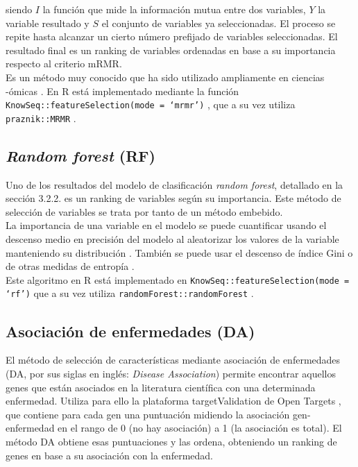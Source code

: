 siendo $I$ la función que mide la información mutua entre dos variables, $Y$ la variable resultado y $S$ el conjunto de variables ya seleccionadas. El proceso se repite hasta alcanzar un cierto número prefijado de variables seleccionadas. El resultado final es un ranking de variables ordenadas en base a su importancia respecto al criterio mRMR.\\

Es un método muy conocido que ha sido utilizado ampliamente en ciencias -ómicas \cite{Ding2005, Yang2013, Galvez2018, Castillo2019, Galvez2020}. En R está implementado mediante la función \texttt{KnowSeq::\linebreak featureSelection(mode = `mrmr')} \cite{KnowSeq}, que a su vez utiliza \texttt{praznik::MRMR} \cite{Kursa2020}.

\subsection{\textit{Random forest} (RF)}

Uno de los resultados del modelo de clasificación \textit{random forest}, detallado en la sección 3.2.2. es un ranking de variables según su importancia. Este método de selección de variables se trata por tanto de un método embebido.\\

La importancia de una variable en el modelo se puede cuantificar usando el descenso medio en precisión del modelo al aleatorizar los valores de la variable manteniendo su distribución \cite{Breiman2001, Breiman2002}. También se puede usar el descenso de índice Gini o de otras medidas de entropía \cite{Louppe2013}.\\

Este algoritmo en R está implementado en \texttt{KnowSeq::featureSelection(mode = `rf')} \cite{KnowSeq} que a su vez utiliza \texttt{randomForest::randomForest} \cite{Liaw2002}.

\subsection{Asociación de enfermedades (DA)}

El método de selección de características mediante asociación de enfermedades (DA, por sus siglas en inglés: \textit{Disease Association}) permite encontrar aquellos genes que están asociados en la literatura científica con una determinada enfermedad. Utiliza para ello la plataforma targetValidation de Open Targets \cite{OpenTargets2020}, que contiene para cada gen una puntuación midiendo la asociación gen-enfermedad en el rango de 0 (no hay asociación) a 1 (la asociación es total). El método DA obtiene esas puntuaciones y las ordena, obteniendo un ranking de genes en base a su asociación con la enfermedad.\\

